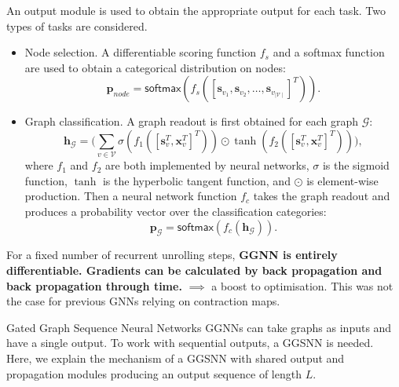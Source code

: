\documentclass[final,hyperref={pdfpagelabels=false}]{beamer}
\begin{document}
\begin{frame}[t]
\begin{columns}[t]
\begin{column}{.3\textwidth}
    An output module is used to obtain the appropriate output for each task. Two types of tasks are considered.
    \begin{itemize}
    \color{oxfordblue}
        \item Node selection. A differentiable scoring function $f_s$ and a softmax function are used to obtain a categorical distribution on nodes:
        \begin{equation}
            \mathbf{p}_{node} = \mathsf{softmax}\left(f_s([\mathbf{s}_{v_1}, \mathbf{s}_{v_2}, \ldots, \mathbf{s}_{v_{\mid \mathcal{V}\mid}}]^T)\right).
        \end{equation}
        \item Graph classification. A graph readout is first obtained for each graph $\mathcal{G}$:
        \begin{equation}
            \mathbf{h}_{\mathcal{G}} = \bigg(
                \displaystyle\sum_{v\in\mathcal{V}}  
                \sigma \left(f_1\left([\mathbf{s}_v^T, \mathbf{x}_v^T]^T\right)\right)
                \odot
                \tanh \left(f_2\left([\mathbf{s}_v^T, \mathbf{x}_v^T]^T\right)\right)
            \bigg),
        \end{equation}
        where $f_1$ and $f_2$ are both implemented by neural networks, $\sigma$ is the sigmoid function, $\tanh$ is the hyperbolic tangent function, and $\odot$ is element-wise production. Then a neural network function $f_c$ takes the graph readout and produces a probability vector over the classification categories:
        \begin{equation}
            \mathbf{p}_{\mathcal{G}} = \mathsf{softmax}\left(f_c\left(\mathbf{h}_{\mathcal{G}}\right)\right).
        \end{equation}
    \end{itemize}
    
    For a fixed number of recurrent unrolling steps, \textbf{GGNN is entirely differentiable. Gradients can be calculated by back propagation and back propagation through time.} $\implies$ a boost to optimisation. This was not the case for previous GNNs relying on contraction maps.
    
    
    \begin{block}{Gated Graph Sequence Neural Networks}
    GGNNs can take graphs as inputs and have a single output. To work with sequential outputs, a GGSNN is needed. Here, we explain the mechanism of a GGSNN with shared output and propagation modules producing an output sequence of length $L$.\vspace{0.2in}
    

\end{block}
\end{column}
\end{columns}
\end{frame}
\end{document}
